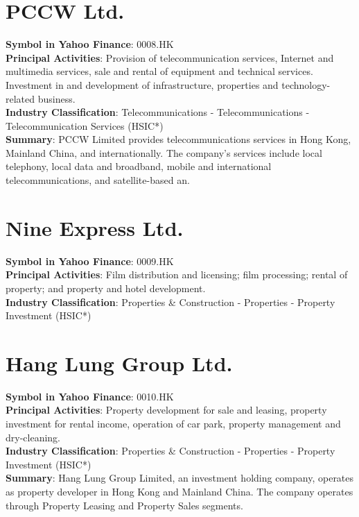 \section{PCCW Ltd.}
\textbf{Symbol in Yahoo Finance}: 0008.HK\\
\textbf{Principal Activities}: Provision of telecommunication services, Internet and multimedia services, sale and rental of equipment and technical services. Investment in and development of infrastructure, properties and technology-related business.\\
\textbf{Industry Classification}: Telecommunications - Telecommunications - Telecommunication Services (HSIC*)\\
\textbf{Summary}: PCCW Limited provides telecommunications services in Hong Kong, Mainland China, and internationally. The company's services include local telephony, local data and broadband, mobile and international telecommunications, and satellite-based an.


\section{Nine Express Ltd.}
\textbf{Symbol in Yahoo Finance}: 0009.HK\\
\textbf{Principal Activities}: Film distribution and licensing; film processing; rental of property; and property and hotel development.\\
\textbf{Industry Classification}: Properties \& Construction - Properties - Property Investment (HSIC*)


\section{Hang Lung Group Ltd.}
\textbf{Symbol in Yahoo Finance}: 0010.HK\\
\textbf{Principal Activities}: Property development for sale and leasing, property investment for rental income, operation of car park, property management and dry-cleaning.\\
\textbf{Industry Classification}: Properties \& Construction - Properties - Property Investment (HSIC*)\\
\textbf{Summary}: Hang Lung Group Limited, an investment holding company, operates as property developer in Hong Kong and Mainland China. The company operates through Property Leasing and Property Sales segments.


